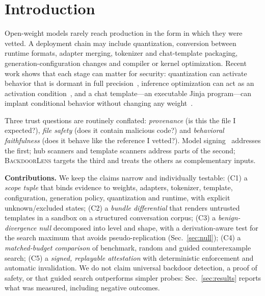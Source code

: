 \IfFileExists{IEEEtran.cls}{\documentclass[conference]{IEEEtran}\newcommand{\hasieee}{1}}{\documentclass[10pt,twocolumn]{article}\newcommand{\hasieee}{0}}
\newcommand{\bl}{\textsc{BackdoorLens}}
\begin{document}
\section{Introduction}
Open-weight models rarely reach production in the form in which they were vetted. A deployment chain may include quantization, conversion between runtime formats, adapter merging, tokenizer and chat-template packaging, generation-configuration changes and compiler or kernel optimization. Recent work shows that each stage can matter for security: quantization can activate behavior that is dormant in full precision~\cite{qtb,agentq}, inference optimization can act as an activation condition~\cite{opttrig}, and a chat template---an executable Jinja program---can implant conditional behavior without changing any weight~\cite{chattmpl}.

Three trust questions are routinely conflated: \emph{provenance} (is this the file I expected?), \emph{file safety} (does it contain malicious code?) and \emph{behavioral faithfulness} (does it behave like the reference I vetted?). Model signing~\cite{sigstore} addresses the first; hub scanners and template scanners address parts of the second; \bl{} targets the third and treats the others as complementary inputs.

\textbf{Contributions.} We keep the claims narrow and individually testable: (C1) a \emph{scope tuple} that binds evidence to weights, adapters, tokenizer, template, configuration, generation policy, quantization and runtime, with explicit unknown/excluded states; (C2) a \emph{bundle differential} that renders untrusted templates in a sandbox on a structured conversation corpus; (C3) a \emph{benign-divergence null} decomposed into level and shape, with a derivation-aware test for the search maximum that avoids pseudo-replication (Sec.~\ref{sec:null}); (C4) a \emph{matched-budget comparison} of benchmark, random and guided counterexample search; (C5) a \emph{signed, replayable attestation} with deterministic enforcement and automatic invalidation. We do not claim universal backdoor detection, a proof of safety, or that guided search outperforms simpler probes: Sec.~\ref{sec:results} reports what was measured, including negative outcomes.
\end{document}
